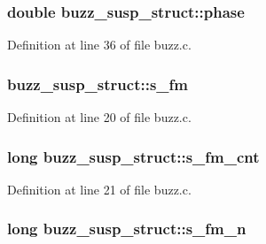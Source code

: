 \subsubsection[{\texorpdfstring{phase}{phase}}]{\setlength{\rightskip}{0pt plus 5cm}double buzz\+\_\+susp\+\_\+struct\+::phase}\hypertarget{structbuzz__susp__struct_ad9949c8c6c8223a27a67eaf329c662e9}{}\label{structbuzz__susp__struct_ad9949c8c6c8223a27a67eaf329c662e9}


Definition at line 36 of file buzz.\+c.

\subsubsection[{\texorpdfstring{s\+\_\+fm}{s_fm}}]{ buzz\+\_\+susp\+\_\+struct\+::s\+\_\+fm}\hypertarget{structbuzz__susp__struct_a71a1c4e6c06073f273ae9e70922f7e10}{}\label{structbuzz__susp__struct_a71a1c4e6c06073f273ae9e70922f7e10}


Definition at line 20 of file buzz.\+c.

\subsubsection[{\texorpdfstring{s\+\_\+fm\+\_\+cnt}{s_fm_cnt}}]{\setlength{\rightskip}{0pt plus 5cm}long buzz\+\_\+susp\+\_\+struct\+::s\+\_\+fm\+\_\+cnt}\hypertarget{structbuzz__susp__struct_a43bebd0378627cb000083354cfdc7222}{}\label{structbuzz__susp__struct_a43bebd0378627cb000083354cfdc7222}


Definition at line 21 of file buzz.\+c.

\subsubsection[{\texorpdfstring{s\+\_\+fm\+\_\+n}{s_fm_n}}]{\setlength{\rightskip}{0pt plus 5cm}long buzz\+\_\+susp\+\_\+struct\+::s\+\_\+fm\+\_\+n}\hypertarget{structbuzz__susp__struct_a61a97b88886acf1b39744279a3fdc70f}{}\label{structbuzz__susp__struct_a61a97b88886acf1b39744279a3fdc70f}


